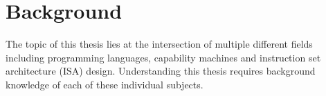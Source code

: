 \chapter{Background}
\label{cha:litrev}
The topic of this thesis lies at the intersection of multiple different fields including programming languages, capability machines and instruction set architecture (ISA) design. Understanding this thesis requires background knowledge of each of these individual subjects.





